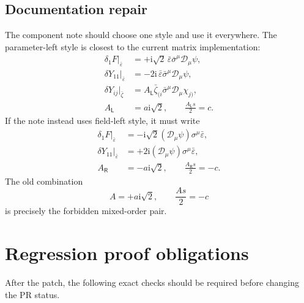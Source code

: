 \documentclass[11pt,a4paper,UTF8]{ctexart}
\numberwithin{equation}{section}
\newcommand{\ii}{\mathrm i}
\newcommand{\cD}{\mathcal D}
\newcommand{\eps}{\varepsilon}
\newcommand{\PL}{\mathsf L}
\newcommand{\PR}{\mathsf R}
\newcommand{\slot}{\big\vert}
\begin{document}
\subsection{Documentation repair}

The component note should choose one style and use it everywhere. The parameter-left style is closest to the current matrix implementation:
\begin{align}
\delta_1F\slot_{\bar\eps}
&=+\ii\sqrt2\,\bar\eps\bar\sigma^\mu\cD_\mu\psi,
\label{eq:doc-F-left}
\\
\delta Y_{11}\slot_{\bar\eps}
&=-2\ii\,\bar\eps\bar\sigma^\mu\cD_\mu\psi,
\label{eq:doc-Y11-left}
\\
\delta Y_{ij}\slot_{\bar\zeta}
&=A_{\PL}\bar\zeta_{(i}\bar\sigma^\mu\cD_\mu\chi_{j)},
\label{eq:doc-general-left}
\\
A_{\PL}&=a\ii\sqrt2,
\qquad
\frac{A_{\PL}s}{2}=c.
\label{eq:doc-relations-left}
\end{align}
If the note instead uses field-left style, it must write
\begin{align}
\delta_1F\slot_{\bar\eps}
&=-\ii\sqrt2(\cD_\mu\psi)\sigma^\mu\bar\eps,
\\
\delta Y_{11}\slot_{\bar\eps}
&=+2\ii(\cD_\mu\psi)\sigma^\mu\bar\eps,
\\
A_{\PR}&=-a\ii\sqrt2,
\qquad
\frac{A_{\PR}s}{2}=-c.
\end{align}
The old combination
\[
A=+a\ii\sqrt2,
\qquad
\frac{As}{2}=-c
\]
is precisely the forbidden mixed-order pair.

\section{Regression proof obligations}

After the patch, the following exact checks should be required before changing the PR status.
\end{document}
